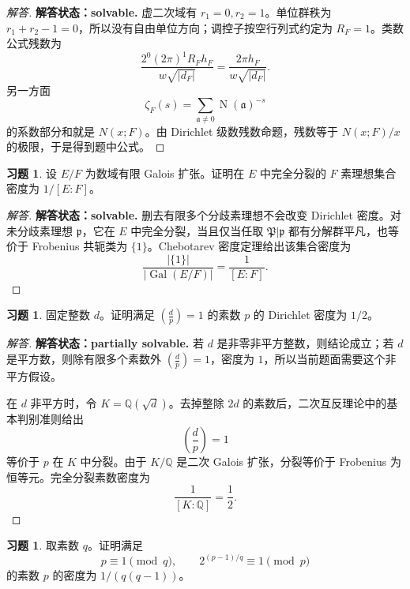 \documentclass[11pt,a4paper,openany]{ctexbook}
\numberwithin{equation}{chapter}
\newcommand{\Q}{\mathbb{Q}}
\newcommand{\Gal}{\operatorname{Gal}}
\newcommand{\Nm}{\operatorname{N}}
\theoremstyle{plain}
\theoremstyle{definition}
\newtheorem{exercise}[theorem]{习题}
\theoremstyle{remark}
\begin{document}
\begin{proof}[解答]
\textbf{解答状态：solvable.}
虚二次域有 $r_1=0,r_2=1$。单位群秩为
$r_1+r_2-1=0$，所以没有自由单位方向；调控子按空行列式约定为
$R_F=1$。类数公式残数为
\[
\frac{2^{0}(2\pi)^1R_Fh_F}{w\sqrt{|d_F|}}
=\frac{2\pi h_F}{w\sqrt{|d_F|}}.
\]
另一方面
\[
\zeta_F(s)=\sum_{\mathfrak a\ne0}\Nm(\mathfrak a)^{-s}
\]
的系数部分和就是 $N(x;F)$。由 Dirichlet 级数残数命题，残数等于
$N(x;F)/x$ 的极限，于是得到题中公式。
\end{proof}

\begin{exercise}
设 $E/F$ 为数域有限 Galois 扩张。证明在 $E$ 中完全分裂的 $F$ 素理想集合密度为 $1/[E:F]$。
\end{exercise}

\begin{proof}[解答]
\textbf{解答状态：solvable.}
删去有限多个分歧素理想不会改变 Dirichlet 密度。对未分歧素理想
$\mathfrak p$，它在 $E$ 中完全分裂，当且仅当任取
$\mathfrak P|\mathfrak p$ 都有分解群平凡，也等价于 Frobenius 共轭类为
\(\{1\}\)。Chebotarev 密度定理给出该集合密度为
\[
\frac{|\{1\}|}{|\Gal(E/F)|}=\frac1{[E:F]}.
\]
\end{proof}

\begin{exercise}
固定整数 $d$。证明满足 $\left(\frac d p\right)=1$ 的素数 $p$ 的 Dirichlet 密度为 $1/2$。
\end{exercise}

\begin{proof}[解答]
\textbf{解答状态：partially solvable.}
若 $d$ 是非零非平方整数，则结论成立；若 $d$ 是平方数，则除有限多个素数外
\(\left(\frac dp\right)=1\)，密度为 $1$，所以当前题面需要这个非平方假设。

在 $d$ 非平方时，令 $K=\Q(\sqrt d)$。去掉整除 $2d$ 的素数后，二次互反理论中的基本判别准则给出
\[
\left(\frac d p\right)=1
\]
等价于 $p$ 在 $K$ 中分裂。由于 $K/\Q$ 是二次 Galois 扩张，分裂等价于 Frobenius 为恒等元。完全分裂素数密度为
\[
\frac1{[K:\Q]}=\frac12.
\]
\end{proof}

\begin{exercise}
取素数 $q$。证明满足
\[
p\equiv1\pmod q,\qquad 2^{(p-1)/q}\equiv1\pmod p
\]
的素数 $p$ 的密度为 $1/(q(q-1))$。
\end{exercise}
\end{document}
